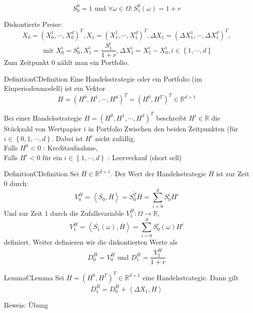 \documentclass[11.5 pt, a4paper]{memoir}
\begin{document}
$$ S_0^0 = 1 \text{ und }  \forall \omega  \in \Omega : S_1^{0}(\omega ) = 1 + r $$

Diskontierte Preise: 
$$ X_0 = \left( X_0^1 , \cdots,  X_0^{d} \right)^{T}, X_1 = \left( X_1^1 , \cdots,  X_1^{d} \right)^{T}, \Delta X_1 = \left(\Delta X_1^1 , \cdots, \Delta X_1^{d} \right)^{T},  $$
$$ \text{ mit } X_0^i = S_0^i, X_1^i = \frac{S_1^i}{1+r} , \Delta X_1^i = X_1^{i} - X_0^i, i \in \left\{ 1 , \cdots,  d \right\}  $$
Zum Zeitpunkt $ 0 $ nählt man ein Portfolio.

\begin{ibox}[1.1]{Definition}{CDefinition}
    Eine Handelsstrategie oder ein Portfolio (im Einperiodenmodell) ist ein Vektor 
		$$ \overline{ H} = \left( H^0, H^1 , \cdots,  H^d \right)^{T} = \left( H^0, H^T \right)^T \in \mathbb{R}^{d+1}  $$
\end{ibox}
Bei einer Handelsstrategie $ \overline{ H} = \left(  H^0, H^1 , \cdots,  H^d \right)^{T}  $ beschreibt $ H^{i} \in \mathbb{R} $ die Stückzahl von Wertpapier $ i  $ in Portfolio Zwischen den beiden Zeitpunkten (für $ i \in \left\{ 0, 1 , \cdots,  d \right\}  $. Dabei ist $ H^{i} $ nicht zufällig. \\

Falls $ H^0 < 0 $ : Kreditaufnahme, \\
Falls $ H^{i} < 0 $ für ein $ i \in \left\{ 1 , \cdots,  d \right\}  $ : Leerverkauf (short sell)

\begin{ibox}[1.2]{Definition}{CDefinition}
    Sei $ \overline{ H} \in \mathbb{R}^{d+1}  $. Der Wert der Handelsstrategie $ \overline{ H}  $ ist zur Zeit $ 0 $ durch:
		$$ V_0^{ \overline{ H} } = \left< \overline{ S_0}, \overline{ H}   \right> = \overline{ S_0^T} \overline{ H} = \sum_{i=0}^{d} S_0^i H^i   $$
	Und zur Zeit $ 1 $ durch die Zufallsvariable $ V_1^{ \overline{ H} } : \Omega \to \mathbb{R} $,
	$$ V_1^{ \overline{ H} } = \left< \overline{ S_1} (\omega ), \overline{ H}   \right> =  \sum_{i=0}^{d} S_0^i (\omega ) H^i   $$
	definiert. Weiter definieren wir die diskontierten Werte als 
	$$ D_0^{ \overline{ H} } = V_0^{ \overline{ H} } \text{ und }  D_1^{ \overline{ H} } = \frac{V_1^{ \overline{ H} }}{1 +r} $$
\end{ibox}

\begin{ibox}[1.3]{Lemma}{CLemma}
    Sei $ \overline{ H} = \left( H^0, H^T \right)^T \in \mathbb{R}^{d+1}  $ eine Handelsstrategie. Dann gilt 
		$$ D_1^{ \overline{ H} } = D_0 ^{ \overline{ H} } + \left< \Delta X_1, H \right> $$
\end{ibox}
Beweis: Übung
\end{document}
